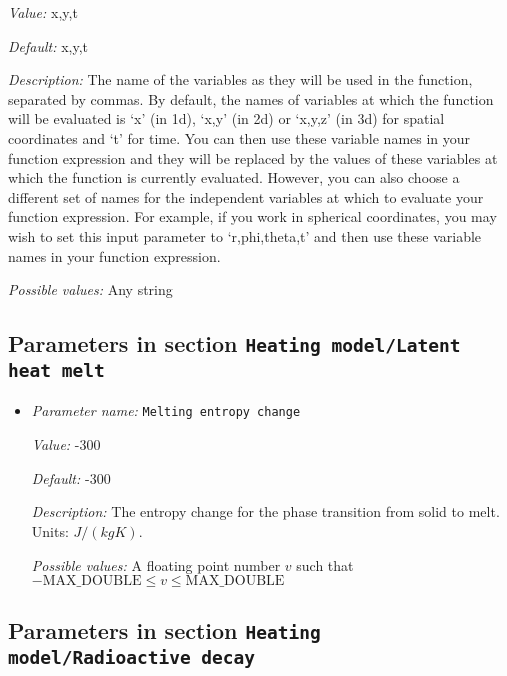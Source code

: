 \begin{itemize}
{\it Value:} x,y,t


{\it Default:} x,y,t


{\it Description:} The name of the variables as they will be used in the function, separated by commas. By default, the names of variables at which the function will be evaluated is `x' (in 1d), `x,y' (in 2d) or `x,y,z' (in 3d) for spatial coordinates and `t' for time. You can then use these variable names in your function expression and they will be replaced by the values of these variables at which the function is currently evaluated. However, you can also choose a different set of names for the independent variables at which to evaluate your function expression. For example, if you work in spherical coordinates, you may wish to set this input parameter to `r,phi,theta,t' and then use these variable names in your function expression.


{\it Possible values:} Any string
\end{itemize}

\subsection{Parameters in section \tt Heating model/Latent heat melt}
\label{parameters:Heating_20model/Latent_20heat_20melt}

\begin{itemize}
\item {\it Parameter name:} {\tt Melting entropy change}
\label{parameters:Heating model/Latent heat melt/Melting entropy change}


{\it Value:} -300


{\it Default:} -300


{\it Description:} The entropy change for the phase transition from solid to melt. Units: $J/(kg K)$.


{\it Possible values:} A floating point number $v$ such that $-\text{MAX\_DOUBLE} \leq v \leq \text{MAX\_DOUBLE}$
\end{itemize}

\subsection{Parameters in section \tt Heating model/Radioactive decay}
\label{parameters:Heating_20model/Radioactive_20decay}

